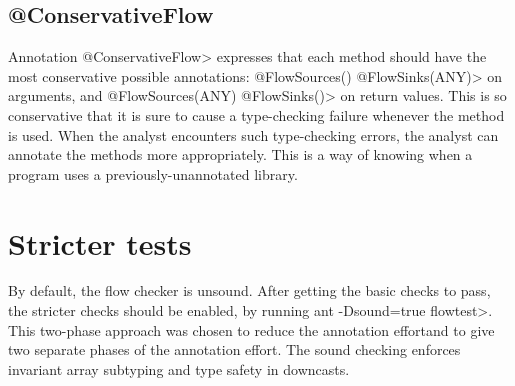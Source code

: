 \subsection{@ConservativeFlow}

Annotation \<@ConservativeFlow> expresses that each method should have the
most conservative possible annotations:
  \<@FlowSources({}) @FlowSinks(ANY)> on arguments, and
  \<@FlowSources(ANY) @FlowSinks({})> on return values.
This is so conservative that it is sure to cause a type-checking failure
whenever the method is used.
When the analyst encounters such type-checking errors, the analyst can
annotate the methods more appropriately.  This is a way of knowing when a
program uses a previously-unannotated library.




%
%
%




\section{Stricter tests}

By default, the flow checker is unsound.  After getting the basic checks to pass, the
 stricter checks should be enabled, by running \<ant -Dsound=true flowtest>.
This two-phase approach was chosen to reduce
the annotation effortand to give two separate phases of
the annotation effort.
 The sound checking enforces invariant 
array subtyping and type safety in downcasts.


